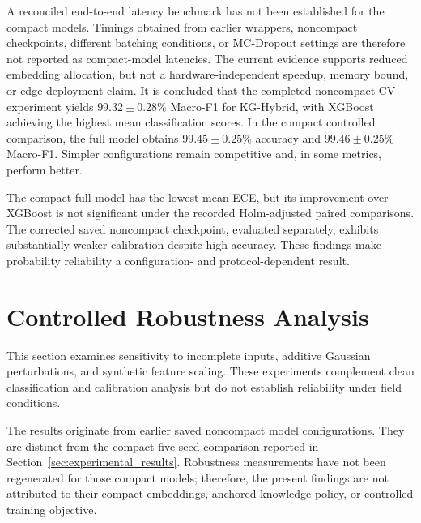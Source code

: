 A reconciled end-to-end latency benchmark has not been established
for the compact models. Timings obtained from earlier wrappers,
noncompact checkpoints, different batching conditions, or
MC-Dropout settings are therefore not reported as compact-model
latencies. The current evidence supports reduced embedding
allocation, but not a hardware-independent speedup, memory bound,
or edge-deployment claim. It is concluded that the
completed noncompact CV experiment yields
$99.32\pm0.28\%$ Macro-F1 for KG-Hybrid, with XGBoost
achieving the highest mean classification scores.
In the compact controlled comparison, the full model obtains
$99.45\pm0.25\%$ accuracy and
$99.46\pm0.25\%$ Macro-F1.
Simpler configurations remain competitive and, in some metrics,
perform better.

The compact full model has the lowest mean ECE, but its improvement
over XGBoost is not significant under the recorded Holm-adjusted
paired comparisons. The corrected saved noncompact checkpoint,
evaluated separately, exhibits substantially weaker calibration
despite high accuracy. These findings make probability reliability
a configuration- and protocol-dependent result.



\section{Controlled Robustness Analysis}
\label{sec:robustness}

This section examines sensitivity to incomplete inputs, additive
Gaussian perturbations, and synthetic feature scaling. These
experiments complement clean classification and calibration analysis
but do not establish reliability under field conditions.

The results originate from earlier saved noncompact model
configurations. They are distinct from the compact five-seed comparison
reported in Section~\ref{sec:experimental_results}. Robustness
measurements have not been regenerated for those compact models;
therefore, the present findings are not attributed to their compact
embeddings, anchored knowledge policy, or controlled training objective.

